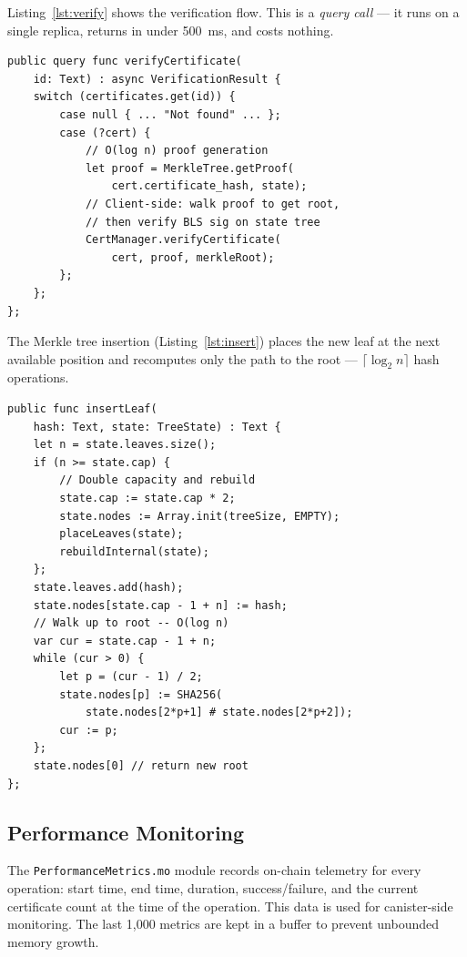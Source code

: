\documentclass[journal]{IEEEtran}
\begin{document}
Listing~\ref{lst:verify} shows the verification flow. This is a \emph{query call} — it runs on a single replica, returns in under 500~ms, and costs nothing.

\begin{lstlisting}[caption={Simplified verification flow},label={lst:verify},language={}]
public query func verifyCertificate(
    id: Text) : async VerificationResult {
    switch (certificates.get(id)) {
        case null { ... "Not found" ... };
        case (?cert) {
            // O(log n) proof generation
            let proof = MerkleTree.getProof(
                cert.certificate_hash, state);
            // Client-side: walk proof to get root,
            // then verify BLS sig on state tree
            CertManager.verifyCertificate(
                cert, proof, merkleRoot);
        };
    };
};
\end{lstlisting}

The Merkle tree insertion (Listing~\ref{lst:insert}) places the new leaf at the next available position and recomputes only the path to the root — $\lceil\log_2 n\rceil$ hash operations.

\begin{lstlisting}[caption={Incremental Merkle leaf insertion},label={lst:insert},language={}]
public func insertLeaf(
    hash: Text, state: TreeState) : Text {
    let n = state.leaves.size();
    if (n >= state.cap) {
        // Double capacity and rebuild
        state.cap := state.cap * 2;
        state.nodes := Array.init(treeSize, EMPTY);
        placeLeaves(state);
        rebuildInternal(state);
    };
    state.leaves.add(hash);
    state.nodes[state.cap - 1 + n] := hash;
    // Walk up to root -- O(log n)
    var cur = state.cap - 1 + n;
    while (cur > 0) {
        let p = (cur - 1) / 2;
        state.nodes[p] := SHA256(
            state.nodes[2*p+1] # state.nodes[2*p+2]);
        cur := p;
    };
    state.nodes[0] // return new root
};
\end{lstlisting}

\subsection{Performance Monitoring}

The \texttt{PerformanceMetrics.mo} module records on-chain telemetry for every operation: start time, end time, duration, success/failure, and the current certificate count at the time of the operation. This data is used for canister-side monitoring. The last 1,000 metrics are kept in a buffer to prevent unbounded memory growth.
\end{document}
